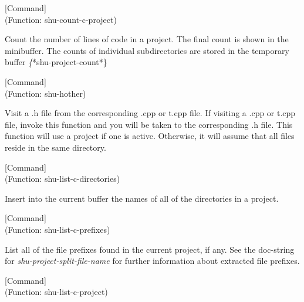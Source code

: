 \vspace{1em}
\noindent
{}
\usebox{\funcname}
 \hfill [Command]\\%
 (Function: shu-count-c-project)

\begin{doc-string}
Count the number of lines of code in a project.  The final count is shown in
the minibuffer.  The counts of individual subdirectories are stored in the
temporary buffer \emph\{*shu-project-count*\}
\end{doc-string}

\vspace{1em}
\noindent
{}
\usebox{\funcname}
 \hfill [Command]\\%
 (Function: shu-hother)

\begin{doc-string}
Visit a .h file from the corresponding .cpp or t.cpp file.  If visiting a
.cpp or t.cpp file, invoke this function and you will be taken to the
corresponding .h file.  This function will use a project if one is active.
Otherwise, it will assume that all files reside in the same directory.
\end{doc-string}

\vspace{1em}
\noindent
{}
\usebox{\funcname}
 \hfill [Command]\\%
 (Function: shu-list-c-directories)

\begin{doc-string}
Insert into the current buffer the names of all of the directories in a project.
\end{doc-string}

\vspace{1em}
\noindent
{}
\usebox{\funcname}
 \hfill [Command]\\%
 (Function: shu-list-c-prefixes)

\begin{doc-string}
List all of the file prefixes found in the current project, if any.
See the doc-string for \emph{shu-project-split-file-name} for further information
about extracted file prefixes.
\end{doc-string}

\vspace{1em}
\noindent
{}
\usebox{\funcname}
 \hfill [Command]\\%
 (Function: shu-list-c-project)

